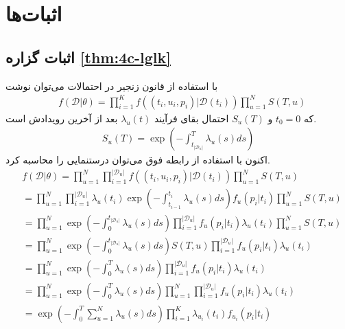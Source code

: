 \chapter{اثبات‌ها}\label{Chap:App2}

\section*{اثبات گزاره \ref{thm:4c-lglk}}\label{app:4c-lglk}
با استفاده از قانون زنجیر در احتمالات می‌توان نوشت
\begin{align}
&f(\mathcal{D} \vert \theta) = \prod_{i=1}^K f\left((t_i,u_i,p_i)| \mathcal{D}(t_i)\right) \prod_{u=1}^{N} S(T,u) \nonumber 
\end{align}
که $t_0=0$ و $S_u(T)$ احتمال بقای فرآیند $\lambda_u(t)$ بعد از آخرین رویدادش است.
\begin{align}
S_u(T) = \exp\left(-\int_{t_{\vert\mathcal{D}_u\vert}}^T  \lambda_{u}(s) ds\right) \nonumber
\end{align}
اکنون با استفاده از رابطه فوق می‌توان درستنمایی را محاسبه کرد.
 \begin{align}
&f(\mathcal{D} \vert \theta) 
= \prod_{u=1}^{N}	\prod_{i=1}^{\vert\mathcal{D}_u\vert} f\left((t_i,u_i,p_i)| \mathcal{D}(t_i)\right) \prod_{u=1}^{N} S(T,u) \nonumber \\
&= \prod_{u=1}^{N}	\prod_{i=1}^{\vert\mathcal{D}_u\vert} \lambda_{u}(t_i) \exp\left(-\int_{t_{i-1}}^{t_i} \lambda_{u}(s) ds\right) f_{u}(p_i | t_i)
 \prod_{u=1}^{N} S(T,u) \nonumber 
\end{align}
\begin{align}
&= \prod_{u=1}^{N} \exp\left(-\int_0^{t_{\vert\mathcal{D}_u\vert}} \lambda_{u}(s) ds\right)  \prod_{i=1}^{\vert\mathcal{D}_u\vert} f_{u}(p_i | t_i) \lambda_{u}(t_i)  \prod_{u=1}^{N} S(T,u) \nonumber \\
&= \prod_{u=1}^{N} \exp\left(-\int_0^{t_{\vert\mathcal{D}_u\vert}}  \lambda_{u}(s) ds\right) S(T,u)
\prod_{i=1}^{\vert\mathcal{D}_u\vert} f_{u}(p_i | t_i) \lambda_{u}(t_i) \nonumber\\
&= \prod_{u=1}^{N} \exp\left(-\int_0^T  \lambda_{u}(s) ds\right) 
\prod_{i=1}^{\vert\mathcal{D}_u\vert} f_{u}(p_i | t_i) \lambda_{u}(t_i) \nonumber
\\
&= \prod_{u=1}^{N} \exp\left(-\int_0^T  \lambda_{u}(s) ds\right) 
\prod_{u=1}^{N} \prod_{i=1}^{\vert\mathcal{D}_u\vert} f_{u}(p_i | t_i) \lambda_{u}(t_i) \nonumber \\
&=\exp\left(-\int_0^T \sum_{u=1}^N \lambda_u(s) ds \right) \prod_{i=1}^K \lambda_{u_i}(t_i) f_{u_i}(p_i|t_i) \nonumber
\end{align}	


